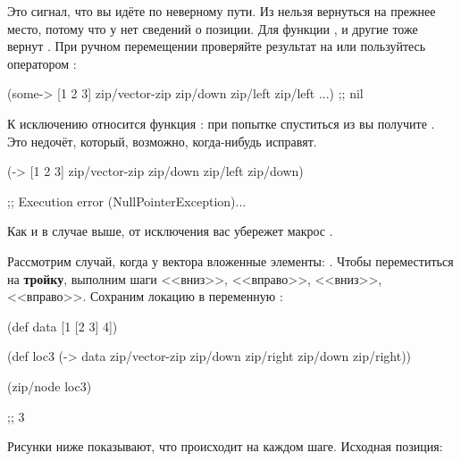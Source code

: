 Это сигнал, что вы идёте по неверному пути. Из  нельзя вернуться на
прежнее место, потому что у  нет сведений о позиции. Для 
функции ,  и другие тоже вернут . При
ручном перемещении проверяйте результат на  или пользуйтесь оператором
:

\begin{english}
  \begin{clojure}
(some-> [1 2 3]
        zip/vector-zip
        zip/down
        zip/left
        zip/left
        ...)
;; nil
  \end{clojure}
\end{english}

К исключению относится функция : при попытке спуститься из  вы
получите . Это недочёт, который, возможно, когда-нибудь
исправят.


\begin{english}
  \begin{clojure}
(-> [1 2 3]
    zip/vector-zip
    zip/down
    zip/left
    zip/down)

;; Execution error (NullPointerException)...
  \end{clojure}
\end{english}

Как и в случае выше, от исключения вас убережет макрос .

Рассмотрим случай, когда у вектора вложенные элементы: \code{[1 [2 3] 4]}. Чтобы
переместиться на \textbf{тройку}, выполним шаги <<вниз>>, <<вправо>>, <<вниз>>,
<<вправо>>. Сохраним локацию в переменную :

\begin{english}
  \begin{clojure}
(def data
  [1 [2 3] 4])

(def loc3
  (-> data
      zip/vector-zip
      zip/down
      zip/right
      zip/down
      zip/right))

(zip/node loc3)

;; 3
  \end{clojure}
\end{english}

Рисунки ниже показывают, что происходит на каждом шаге. Исходная позиция:

\begin{figure}[H]
  \centering
  
  \label{fig:chart-zip-04}
\end{figure}

